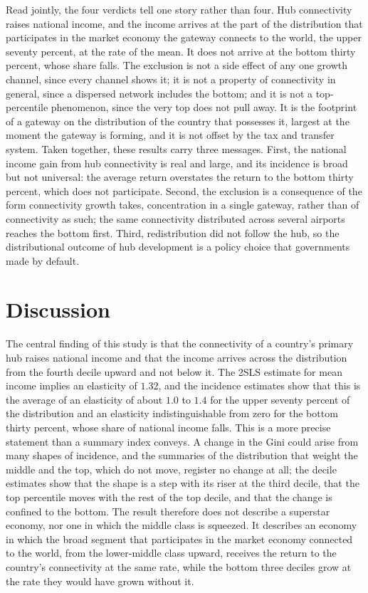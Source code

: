 Read jointly, the four verdicts tell one story rather than four. Hub connectivity raises national income, and the income arrives at the part of the distribution that participates in the market economy the gateway connects to the world, the upper seventy percent, at the rate of the mean. It does not arrive at the bottom thirty percent, whose share falls. The exclusion is not a side effect of any one growth channel, since every channel shows it; it is not a property of connectivity in general, since a dispersed network includes the bottom; and it is not a top-percentile phenomenon, since the very top does not pull away. It is the footprint of a gateway on the distribution of the country that possesses it, largest at the moment the gateway is forming, and it is not offset by the tax and transfer system. Taken together, these results carry three messages. First, the national income gain from hub connectivity is real and large, and its incidence is broad but not universal: the average return overstates the return to the bottom thirty percent, which does not participate. Second, the exclusion is a consequence of the form connectivity growth takes, concentration in a single gateway, rather than of connectivity as such; the same connectivity distributed across several airports reaches the bottom first. Third, redistribution did not follow the hub, so the distributional outcome of hub development is a policy choice that governments made by default.

\section{Discussion}
\label{sec:discussion}
The central finding of this study is that the connectivity of a country's primary hub raises national income and that the income arrives across the distribution from the fourth decile upward and not below it. The 2SLS estimate for mean income implies an elasticity of $1.32$, and the incidence estimates show that this is the average of an elasticity of about $1.0$ to $1.4$ for the upper seventy percent of the distribution and an elasticity indistinguishable from zero for the bottom thirty percent, whose share of national income falls. This is a more precise statement than a summary index conveys. A change in the Gini could arise from many shapes of incidence, and the summaries of the distribution that weight the middle and the top, which do not move, register no change at all; the decile estimates show that the shape is a step with its riser at the third decile, that the top percentile moves with the rest of the top decile, and that the change is confined to the bottom. The result therefore does not describe a superstar economy, nor one in which the middle class is squeezed. It describes an economy in which the broad segment that participates in the market economy connected to the world, from the lower-middle class upward, receives the return to the country's connectivity at the same rate, while the bottom three deciles grow at the rate they would have grown without it.

